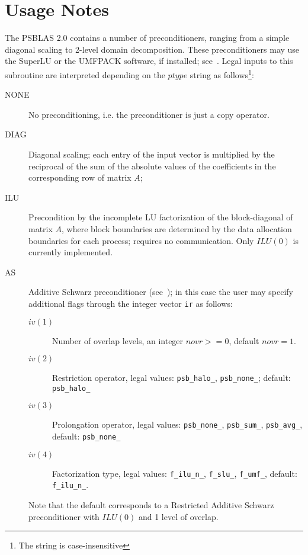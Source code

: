 \section*{Usage Notes}
The PSBLAS 2.0 contains a number of preconditioners, ranging from a
simple diagonal scaling to 2-level domain decomposition. These
preconditioners may use the SuperLU or the UMFPACK software, if
installed; see~\cite{SUPERLU,UMFPACK}. 
Legal inputs to this subroutine are interpreted depending on the
$ptype$ string as follows\footnote{The string is case-insensitive}:
\begin{description}
\item[NONE] No preconditioning, i.e. the preconditioner is just a copy
  operator.
\item[DIAG] Diagonal scaling; each entry of the input vector is
  multiplied by the reciprocal of the sum of the absolute values of
  the coefficients in the corresponding row of matrix  $A$;
\item[ILU] Precondition by the incomplete LU factorization of the
  block-diagonal of matrix $A$, where block boundaries are determined
  by the data allocation boundaries for each process; requires no
  communication. Only $ILU(0)$ is currently implemented. 
\item[AS] Additive Schwarz preconditioner (see~\cite{PARA04}); in this
  case the user may specify additional flags through the integer
  vector \verb|ir| as follows:
\begin{description}
\item[$iv(1)$] Number of overlap levels, an integer $novr>=0$, default
  $novr=1$.  
\item[$iv(2)$] Restriction operator, legal values: \verb|psb_halo_|,
  \verb|psb_none_|; default: \verb|psb_halo_|
\item[$iv(3)$] Prolongation operator, legal values: \verb|psb_none_|,
  \verb|psb_sum_|, \verb|psb_avg_|, default: \verb|psb_none_|
\item[$iv(4)$] Factorization type, legal values: \verb|f_ilu_n_|,
  \verb|f_slu_|, \verb|f_umf_|, default: \verb|f_ilu_n_|.
\end{description}
Note that the default corresponds to a Restricted Additive Schwarz
preconditioner with $ILU(0)$ and 1 level of overlap.

\end{description}
